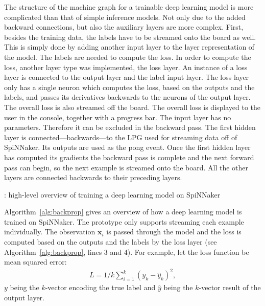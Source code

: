 \documentclass[]{article}
\begin{document}
The structure of the machine graph for a trainable deep learning
model is more complicated than that of simple inference models.
Not only due to the added backward connections, but also the
auxiliary layers are more complex.
First, besides the training data, the labels have to be streamed onto
the board as well.
This is simply done by adding another input layer to the layer
representation of the model.
The labels are needed to compute the loss.
In order to compute the loss, another layer type was implemented,
the loss layer.
An instance of a loss layer is connected to the output layer and the
label input layer.
The loss layer only has a single neuron which computes the loss,
based on the outputs and the labels, and passes its derivatives
backwards to the neurons of the output layer.
The overall loss is also streamed off the board.
The overall loss is displayed to the user in the console, together
with a progress bar.
The input layer has no parameters.
Therefore it can be excluded in the backward pass.
The first hidden layer is connected---backwards---to the LPG used
for streaming data off of SpiNNaker.
Its outputs are used as the pong event.
Once the first hidden layer has computed its gradients the backward
pass is complete and the next forward pass can begin, so the next
example is streamed onto the board.
All the other layers are connected backwards to their preceding
layers.

\begin{algorithm} %
  \caption{: high-level overview of training a deep learning model on
    SpiNNaker}
  \label{alg:backprop}

  \begin{algorithmic}[1]
        \ENDIF
        \ENDIF
      \ENDFOR
    \ENDFOR
  \end{algorithmic}
\end{algorithm} %

Algorithm~\ref{alg:backprop} gives an overview of how a deep
learning model is trained on SpiNNaker.
The prototype only supports streaming each example individually.
The observation $\mathbf{x}_i$ is passed through the model and the
loss is computed based on the outputs and the labels by the loss layer
(see Algorithm~\ref{alg:backprop}, lines 3 and 4).
For example, let the loss function be mean squared error:
\begin{align}
L = 1/k \sum_{i=1}^k(y_k - \hat{y}_k)^2,
\end{align}
$y$ being the $k$-vector encoding the true label and $\hat{y}$ being
the $k$-vector result of the output layer.
\end{document}
